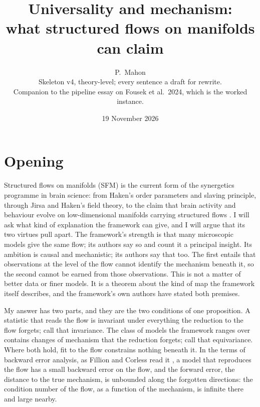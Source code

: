 \documentclass[10pt]{article}
\title{Universality and mechanism:\\ what structured flows on manifolds can claim}
\author{P.~Mahon \\ \small Skeleton v4, theory-level; every sentence a draft for rewrite. \\ \small Companion to the pipeline essay on Fousek et al.\ 2024, which is the worked instance.}
\date{19 November 2026}
\begin{document}
\maketitle

\section*{Opening}
Structured flows on manifolds (SFM) is the current form of the synergetics programme in brain science: from Haken's order parameters and slaving principle, through Jirsa and Haken's field theory, to the claim that brain activity and behaviour evolve on low-dimensional manifolds carrying structured flows \parencite{haken1980,jirsa1996,pillai2017,jirsa2020}. I will ask what kind of explanation the framework can give, and I will argue that its two virtues pull apart. The framework's strength is that many microscopic models give the same flow; its authors say so and count it a principal insight. Its ambition is causal and mechanistic; its authors say that too. The first entails that observations at the level of the flow cannot identify the mechanism beneath it, so the second cannot be earned from those observations. This is not a matter of better data or finer models. It is a theorem about the kind of map the framework itself describes, and the framework's own authors have stated both premises.

My answer has two parts, and they are the two conditions of one proposition. A statistic that reads the flow is invariant under everything the reduction to the flow forgets; call that invariance. The class of models the framework ranges over contains changes of mechanism that the reduction forgets; call that equivariance. Where both hold, fit to the flow constrains nothing beneath it. In the terms of backward error analysis, as Fillion and Corless read it \parencite{fillion2014,fillion2018}, a model that reproduces the flow has a small backward error on the flow, and the forward error, the distance to the true mechanism, is unbounded along the forgotten directions: the condition number of the flow, as a function of the mechanism, is infinite there and large nearby.
\end{document}
